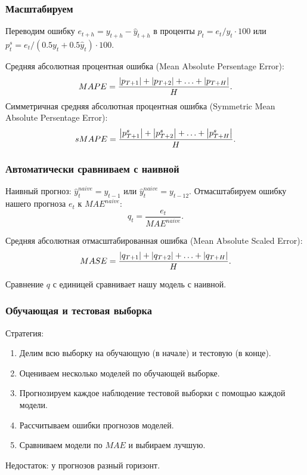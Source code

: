 \begin{frame}
    \frametitle{Масштабируем}

    Переводим ошибку $e_{t+h} = y_{t+h} - \hat y_{t+h}$  \alert{в проценты} $p_t= e_t/y_t \cdot 100$ или
    $p^s_t = e_t/(0.5 y_t + 0.5\hat y_t) \cdot 100$.

    \pause
    \alert{Средняя абсолютная процентная ошибка} (Mean Absolute Persentage Error):
    \[
    MAPE = \frac{\abs {p_{T+1}} + \abs{p_{T+2}}+ \ldots + \abs{p_{T+H}} }{H}.
    \]
    \pause 
    \alert{Симметричная средняя абсолютная процентная ошибка} (Symmetric Mean Absolute Persentage Error):
    \[
    sMAPE = \frac{\abs {p^s_{T+1}} + \abs{p^s_{T+2}}+ \ldots + \abs{p^s_{T+H}} }{H}.
    \]
    
\end{frame}

\begin{frame}
    \frametitle{Автоматически сравниваем с наивной}

    \alert{Наивный прогноз}: $\hat y^{naive}_t = y_{t-1}$ или $\hat y^{naive}_t = y_{t-12}$.
    \pause
    Отмасштабируем ошибку нашего прогноза $e_t$ к $MAE^{naive}$:
    \[
    q_t = \frac{e_t}{MAE^{naive}}.
    \]

    \pause
    \alert{Средняя абсолютная отмасштабированная ошибка} (Mean Absolute Scaled Error):
    \[
    MASE  = \frac{\abs {q_{T+1}} + \abs{q_{T+2}}+ \ldots + \abs{q_{T+H}} }{H}.
    \]

    \pause 
    Сравнение $q$ с единицей сравнивает нашу модель с наивной. 


\end{frame}


\begin{frame}
    \frametitle{Обучающая и тестовая выборка}

    Стратегия: 
    \begin{enumerate}[<+->]
        \item Делим всю выборку на \alert{обучающую} (в начале) и \alert{тестовую} (в конце).
        \item \alert{Оцениваем} несколько моделей по обучающей выборке.
        \item \alert{Прогнозируем} каждое наблюдение тестовой выборки с помощью каждой модели.
        \item Рассчитываем \alert{ошибки} прогнозов моделей.  
        \item \alert{Сравниваем} модели по $MAE$ и выбираем лучшую.
    \end{enumerate}

    \pause
    Недостаток: \alert{у прогнозов разный горизонт}.

\end{frame}


